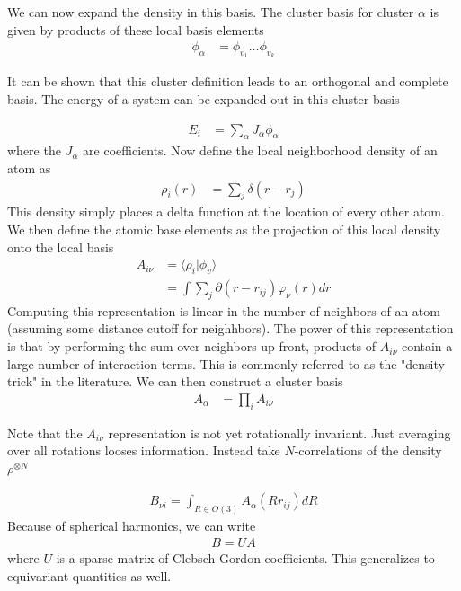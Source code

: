 \documentclass[book.tex]{subfiles}
\begin{document}
We can now expand the density in this basis. The cluster basis for cluster $\alpha$ is given by products of these local basis elements
\begin{align}
\phi_{\alpha} &= \phi_{v_1}\dotsc \phi_{v_k}
\end{align}

It can be shown that this cluster definition leads to an orthogonal and complete basis. The energy of a system can be expanded out in this cluster basis

\begin{align}
E_i &= \sum_{\alpha} J_\alpha \phi_\alpha
\end{align}
where the $J_\alpha$ are coefficients. Now define the local neighborhood density of an atom as
\begin{align}
\rho_i(r) &= \sum_j \delta(r - r_j)
\end{align}
This density simply places a delta function at the location of every other atom. We then define the atomic base elements as the projection of this local density onto the local basis
\begin{align}
A_{i\nu} &= \langle \rho_i | \phi_v \rangle \\
&= \int \sum_j \partial(r - r_{ij}) \varphi_\nu(r) dr 
\end{align}
Computing this representation is linear in the number of neighbors of an atom (assuming some distance cutoff for neighhbors). The power of this representation is that by performing the sum over neighbors up front, products of $A_{i\nu}$ contain a large number of interaction terms. This is commonly referred to as the "density trick" in the literature. We can then construct a cluster basis
\begin{align}
A_\alpha &= \prod_i A_{i\nu}
\end{align}


Note that the $A_{i\nu}$ representation is not yet rotationally invariant. Just averaging over all rotations looses information. Instead take $N$-correlations of the density $\rho^{\otimes N}$

\begin{align}
    B_{\nu i} = \int_{R \in O(3)} A_{\alpha }(R r_{ij}) dR 
\end{align}
Because of spherical harmonics, we can write 
\begin{align}
B = UA
\end{align}
where $U$ is a sparse matrix of Clebsch-Gordon coefficients. This generalizes to equivariant quantities as well.
\end{document}
